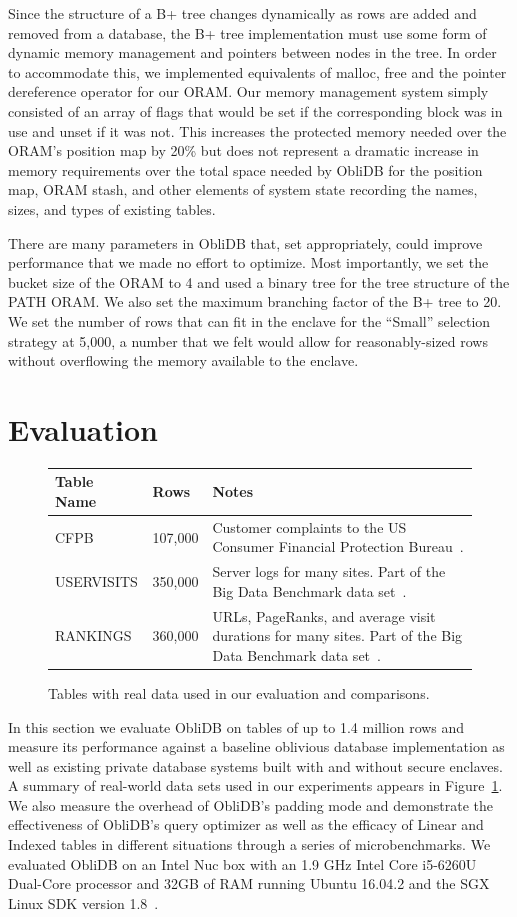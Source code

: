 \documentclass[letterpaper,twocolumn,10pt]{article}
\def\name/{ObliDB}
\begin{document}
Since the structure of a B+ tree changes dynamically as rows are added and removed from a database, the B+ tree implementation must use some form of dynamic memory management and pointers between nodes in the tree. In order to accommodate this, we implemented equivalents of malloc, free and the pointer dereference operator for our ORAM. Our memory management system simply consisted of an array of flags that would be set if the corresponding block was in use and unset if it was not. This increases the protected memory needed over the ORAM's position map by 20\% but does not represent a dramatic increase in memory requirements over the total space needed by \name/ for the position map, ORAM stash, and other elements of system state recording the names, sizes, and types of existing tables. 

There are many parameters in \name/ that, set appropriately, could improve performance that we made no effort to optimize. Most importantly, we set the bucket size of the ORAM to 4 and used a binary tree for the tree structure of the PATH ORAM. We also set the maximum branching factor of the B+ tree to 20. We set the number of rows that can fit in the enclave for the ``Small'' selection strategy at 5,000, a number that we felt would allow for reasonably-sized rows without overflowing the memory available to the enclave. 

\section{Evaluation}\label{eval}
\begin{figure}
\small
\centering
\begin{tabular}{llp{3.1cm}}
\textbf{Table Name} & \textbf{Rows} & \textbf{Notes} \\\hline\rule{0pt}{2ex}
CFPB & 107,000 & Customer complaints to the US Consumer Financial Protection Bureau~\cite{CFPB}.\\
USERVISITS & 350,000 & Server logs for many sites. Part of the Big Data Benchmark data set~\cite{BDB}.\\
RANKINGS & 360,000 & URLs, PageRanks, and average visit durations for many sites. Part of the Big Data Benchmark data set~\cite{BDB}.\\
\end{tabular}
\caption{Tables with real data used in our evaluation and comparisons.}
\label{tabletable}
\end{figure}
In this section we evaluate \name/ on tables of up to 1.4 million rows and measure its performance against a baseline oblivious database implementation as well as existing private database systems built with and without secure enclaves. A summary of real-world data sets used in our experiments appears in Figure~\ref{tabletable}. We also measure the overhead of \name/'s padding mode and  demonstrate the effectiveness of \name/'s query optimizer as well as the efficacy of Linear and Indexed tables in different situations through a series of microbenchmarks. We evaluated \name/ on an Intel Nuc box with an 1.9 GHz Intel Core i5-6260U Dual-Core processor and 32GB of RAM running Ubuntu 16.04.2 and the SGX Linux SDK version 1.8~\cite{SGXRef}. 
\end{document}
